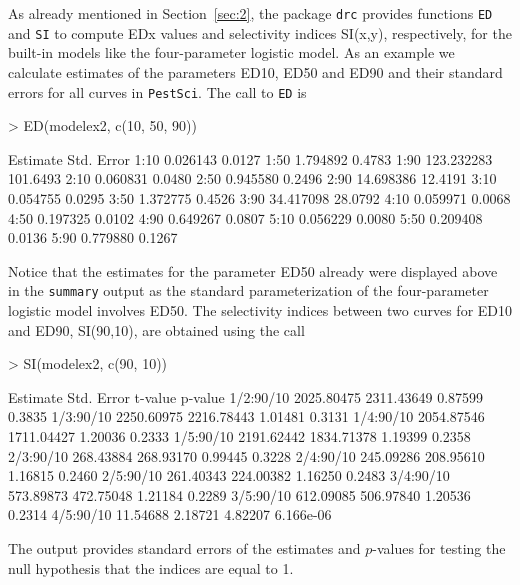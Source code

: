 \documentclass[a4paper]{article}
\begin{document}
As already mentioned in Section~\ref{sec:2}, the package \verb+drc+  provides functions \verb+ED+ and \verb+SI+ to compute EDx values 
and selectivity indices SI(x,y), respectively, for the built-in models like the four-parameter logistic model. As an example we calculate 
estimates of the parameters ED10, ED50 and ED90 and their standard errors for all curves in \verb+PestSci+. The call to \verb+ED+ is

\begin{Schunk}
\begin{Sinput}
> ED(modelex2, c(10, 50, 90))
\end{Sinput}
\begin{Soutput}
       Estimate Std. Error
1:10   0.026143     0.0127
1:50   1.794892     0.4783
1:90 123.232283   101.6493
2:10   0.060831     0.0480
2:50   0.945580     0.2496
2:90  14.698386    12.4191
3:10   0.054755     0.0295
3:50   1.372775     0.4526
3:90  34.417098    28.0792
4:10   0.059971     0.0068
4:50   0.197325     0.0102
4:90   0.649267     0.0807
5:10   0.056229     0.0080
5:50   0.209408     0.0136
5:90   0.779880     0.1267
\end{Soutput}
\end{Schunk}
Notice that the estimates for the parameter ED50 already were displayed above in the \verb+summary+ output as the standard parameterization of the
four-parameter logistic model involves ED50.
The selectivity indices between two curves for ED10 and ED90, SI(90,10), are obtained using the call

\begin{Schunk}
\begin{Sinput}
> SI(modelex2, c(90, 10))
\end{Sinput}
\begin{Soutput}
            Estimate Std. Error    t-value   p-value
1/2:90/10 2025.80475 2311.43649    0.87599    0.3835
1/3:90/10 2250.60975 2216.78443    1.01481    0.3131
1/4:90/10 2054.87546 1711.04427    1.20036    0.2333
1/5:90/10 2191.62442 1834.71378    1.19399    0.2358
2/3:90/10  268.43884  268.93170    0.99445    0.3228
2/4:90/10  245.09286  208.95610    1.16815    0.2460
2/5:90/10  261.40343  224.00382    1.16250    0.2483
3/4:90/10  573.89873  472.75048    1.21184    0.2289
3/5:90/10  612.09085  506.97840    1.20536    0.2314
4/5:90/10   11.54688    2.18721    4.82207 6.166e-06
\end{Soutput}
\end{Schunk}
The output provides standard errors of the estimates and $p$-values for testing the null hypothesis that the indices are equal to 1. 
\end{document}
